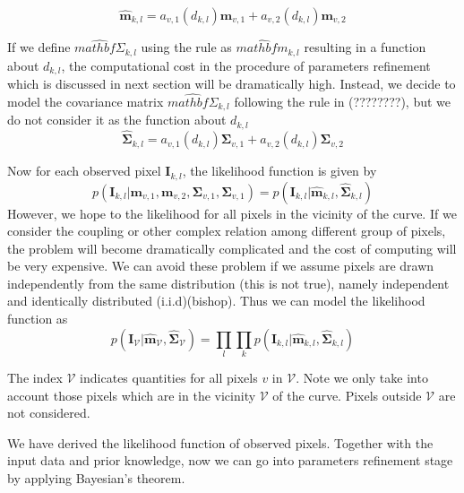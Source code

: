   \begin{equation}
    \label{eq:5.17}
    \hat{\mathbf{m}}_{k,l} = a_{v,1}(d_{k,l})\mathbf{m}_{v,1} + a_{v,2}(d_{k,l})\mathbf{m}_{v,2}
  \end{equation}

If we define  $\hat{mathbf{\Sigma}}_{k,l}$ using the rule as
$\hat{mathbf{m}}_{k,l}$ resulting in a function about $d_{k,l}$, the computational cost in the procedure of
parameters refinement which is discussed in next section  will be dramatically high. Instead, we decide to
model the covariance matrix $\hat{mathbf{\Sigma}}_{k,l}$ following the
rule in (????????), but we do not consider it as the function about $d_{k,l}$
\begin{equation}
  \label{eq:5.18}
  \hat{\mathbf{\mathbf{\Sigma}}}_{k,l} = a_{v,1}(d_{k,l})\mathbf{\Sigma}_{v,1} + a_{v,2}(d_{k,l})\mathbf{\Sigma}_{v,2}
\end{equation}

Now for each observed pixel $\mathbf{I}_{k,l}$, the likelihood
function is given by
\begin{equation}
  \label{eq:5.19}
p(\mathbf{I}_{k,l} | \mathbf{m}_{v,1}, \mathbf{m}_{v,2},
  \mathbf{\Sigma}_{v,1}, \mathbf{\Sigma}_{v,1}) = p(\mathbf{I}_{k,l} | \hat{\mathbf{\mathbf{m}}}_{k,l},\hat{\mathbf{\mathbf{\Sigma}}}_{k,l}) 
\end{equation}
However, we hope to the likelihood for all pixels in the vicinity of
the curve. If we consider the coupling or other complex relation among
different group of pixels, the problem will become dramatically
complicated and the cost of computing will be very expensive. We can
avoid these problem if we assume pixels are drawn independently from the same distribution
(this is not true), namely independent and identically distributed
(i.i.d)(bishop). Thus we can model the likelihood function as
\begin{equation}
  \label{eq:5.20}
  p(\mathbf{I}_{\mathcal{V}} |
  \hat{\mathbf{\mathbf{m}}}_{\mathcal{V}},\hat{\mathbf{\mathbf{\Sigma}}}_{\mathcal{V}})
  = \prod_l \prod_k p(\mathbf{I}_{k,l} | \hat{\mathbf{\mathbf{m}}}_{k,l},\hat{\mathbf{\mathbf{\Sigma}}}_{k,l}) 
\end{equation}

The index $\mathcal{V}$ indicates quantities for all pixels $v$ in
$\mathcal{V}$. Note we only take into account those pixels which are
in the vicinity $\mathcal{V}$ of the curve. Pixels outside
$\mathcal{V}$ are not considered.

We have derived the likelihood function of observed pixels. Together
with the input data and prior knowledge, now we can go into parameters
refinement stage by applying Bayesian's theorem.

